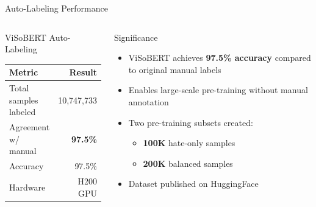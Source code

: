 \documentclass[10pt, aspectratio=169]{beamer}
\begin{document}
\begin{frame}[shrink=5]{Auto-Labeling Performance}
  \begin{columns}[T]
    \begin{block}{ViSoBERT Auto-Labeling}
      \begin{table}[h]
        \centering
        \begin{tabular}{lr}
          \toprule
          \textbf{Metric} & \textbf{Result} \\
          \midrule
          Total samples labeled & 10,747,733 \\
          Agreement w/ manual   & \textbf{97.5\%} \\
          Accuracy              & 97.5\% \\
          Hardware               & H200 GPU \\
          \bottomrule
        \end{tabular}
      \end{table}
    \end{block}

    \begin{exampleblock}{Significance}
      \begin{itemize}
        \item ViSoBERT achieves \textbf{97.5\% accuracy} compared to original manual labels
        \item Enables large-scale pre-training without manual annotation
        \item Two pre-training subsets created:
          \begin{itemize}
            \item \textbf{100K} hate-only samples
            \item \textbf{200K} balanced samples
          \end{itemize}
        \item Dataset published on HuggingFace
      \end{itemize}
    \end{exampleblock}
  \end{columns}
\end{frame}
\end{document}
